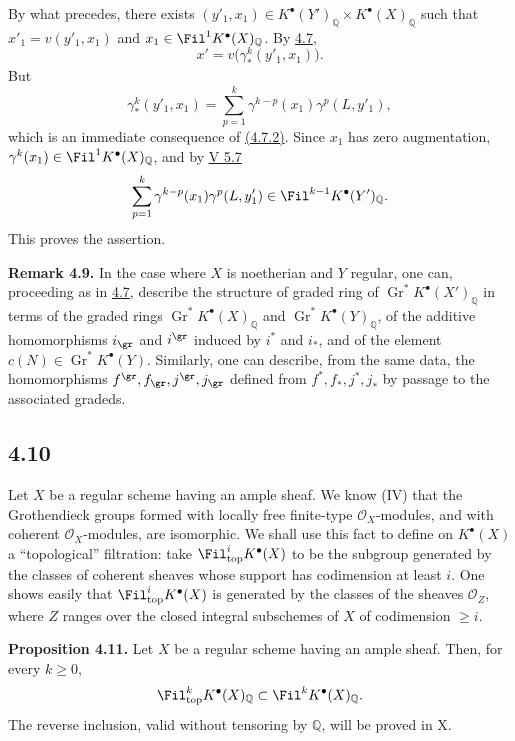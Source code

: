By what precedes, there exists \((y'_1,x_1)\in K^\bullet(Y')_{\mathbb Q}\times K^\bullet(X)_{\mathbb Q}\) such that \(x'_1=v(y'_1,x_1)\) and \(x_1\in\Fil^1K^\bullet(X)_{\mathbb Q}\). By \hyperlink{sga6.e07.sec.4.7}{4.7},
\[
  x'=v\bigl(\gamma^k_*(y'_1,x_1)\bigr).
\]
But
\[
  \gamma^k_*(y'_1,x_1)
  =
  \sum_{p=1}^{k}\gamma^{k-p}(x_1)\gamma^p(L,y'_1),
\]
which is an immediate consequence of \hyperlink{sga6.e07.eq.4-7-2}{(4.7.2)}. Since \(x_1\) has zero augmentation, \(\gamma^k(x_1)\in\Fil^1K^\bullet(X)_{\mathbb Q}\), and by \hyperlink{sga6.e05.prop.5-7}{V 5.7}
\[
  \sum_{p=1}^{k}\gamma^{k-p}(x_1)\gamma^p(L,y'_1)
  \in\Fil^{k-1}K^\bullet(Y')_{\mathbb Q}.
\]
This proves the assertion.

\textbf{Remark 4.9.} In the case where \(X\) is noetherian and \(Y\) regular, one can, proceeding as in \hyperlink{sga6.e07.sec.4.7}{4.7}, describe the structure of graded ring of \(\operatorname{Gr}^*K^\bullet(X')_{\mathbb Q}\) in terms of the graded rings \(\operatorname{Gr}^*K^\bullet(X)_{\mathbb Q}\) and \(\operatorname{Gr}^*K^\bullet(Y)_{\mathbb Q}\), of the additive homomorphisms \(i_{\gr}\) and \(i^{\gr}\) induced by \(i^*\) and \(i_*\), and of the element \(c(N)\in\operatorname{Gr}^*K^\bullet(Y)\). Similarly, one can describe, from the same data, the homomorphisms \(f^{\gr}, f_{\gr}, j^{\gr}, j_{\gr}\) defined from \(f^*, f_*, j^*, j_*\) by passage to the associated gradeds.

\subsection*{4.10}

Let \(X\) be a regular scheme having an ample sheaf. We know (IV) that the Grothendieck groups formed with locally free finite-type \(\mathcal O_X\)-modules, and with coherent \(\mathcal O_X\)-modules, are isomorphic. We shall use this fact to define on \(K^\bullet(X)\) a ``topological'' filtration: take \(\Fil_{\mathrm{top}}^iK^\bullet(X)\) to be the subgroup generated by the classes of coherent sheaves whose support has codimension at least \(i\). One shows easily that \(\Fil_{\mathrm{top}}^iK^\bullet(X)\) is generated by the classes of the sheaves \(\mathcal O_Z\), where \(Z\) ranges over the closed integral subschemes of \(X\) of codimension \(\ge i\).

\textbf{Proposition 4.11.} Let \(X\) be a regular scheme having an ample sheaf. Then, for every \(k\ge0\),
\[
  \Fil_{\mathrm{top}}^kK^\bullet(X)_{\mathbb Q}
  \subset
  \Fil^kK^\bullet(X)_{\mathbb Q}.
\]
The reverse inclusion, valid without tensoring by \(\mathbb Q\), will be proved in X.

